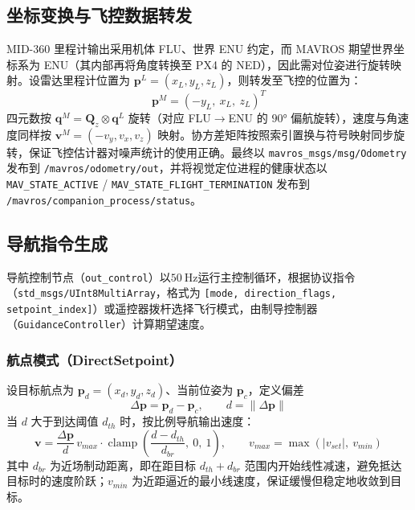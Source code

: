 \subsection{坐标变换与飞控数据转发}
MID-360 里程计输出采用机体 FLU、世界 ENU 约定，而 MAVROS 期望世界坐标系为 ENU（其内部再将角度转换至 PX4 的 NED），因此需对位姿进行旋转映射。设雷达里程计位置为 $\boldsymbol{p}^L=(x_L,y_L,z_L)$，则转发至飞控的位置为：
\begin{equation}
    \boldsymbol{p}^M = \left( -y_L,\ x_L,\ z_L \right)^T
\end{equation}
四元数按 $\boldsymbol{q}^M = \boldsymbol{Q}_{z}\otimes\boldsymbol{q}^L$ 旋转（对应 FLU$\rightarrow$ENU 的 $\ang{90}$ 偏航旋转），速度与角速度同样按 $\boldsymbol{v}^M=(-v_y,v_x,v_z)$ 映射。协方差矩阵按照索引置换与符号映射同步旋转，保证飞控估计器对噪声统计的使用正确。最终以 \lstinline{mavros_msgs/msg/Odometry} 发布到 \lstinline{/mavros/odometry/out}，并将视觉定位进程的健康状态以 \lstinline{MAV_STATE_ACTIVE} / \lstinline{MAV_STATE_FLIGHT_TERMINATION} 发布到 \lstinline{/mavros/companion_process/status}。

\subsection{导航指令生成}
导航控制节点（\lstinline{out_control}）以$\qty{50}{\Hz}$运行主控制循环，根据协议指令（\lstinline{std_msgs/UInt8MultiArray}，格式为 \lstinline{[mode, direction_flags, setpoint_index]}）或遥控器拨杆选择飞行模式，由制导控制器（\lstinline{GuidanceController}）计算期望速度。

\subsubsection{航点模式（DirectSetpoint）}
设目标航点为 $\boldsymbol{p}_d=(x_d,y_d,z_d)$、当前位姿为 $\boldsymbol{p}_c$，定义偏差
\begin{equation}
    \Delta \boldsymbol{p} = \boldsymbol{p}_d - \boldsymbol{p}_c,\qquad
    d = \lVert \Delta\boldsymbol{p} \rVert
\end{equation}
当 $d$ 大于到达阈值 $d_{th}$ 时，按比例导航输出速度：
\begin{equation}
    \boldsymbol{v} = \frac{\Delta\boldsymbol{p}}{d}\, v_{max}
    \cdot \operatorname{clamp}\left( \frac{d - d_{th}}{d_{br}},\ 0,\ 1 \right)
    ,\qquad
    v_{max} = \max\left( \lvert v_{set} \rvert,\ v_{min} \right)
\end{equation}
其中 $d_{br}$ 为近场制动距离，即在距目标 $d_{th}+d_{br}$ 范围内开始线性减速，避免抵达目标时的速度阶跃；$v_{min}$ 为近距逼近的最小线速度，保证缓慢但稳定地收敛到目标。

